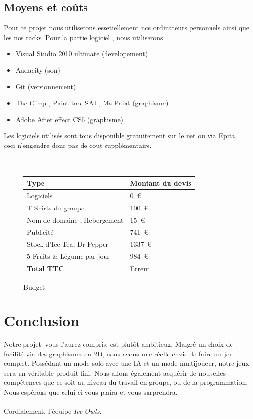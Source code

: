 \documentclass[12pt,a4paper]{article}
\begin{document}
      \subsection{Moyens et coûts}

Pour ce projet nous utiliserons essetiellement nos ordinateurs personnels ainsi que les nos racks.
Pour la partie logiciel , nous utiliserons 
\begin{itemize}
\item Visual Studio 2010 ultimate (developement)
\item Audacity  (son) 
\item Git (versionnement)
\item The Gimp , Paint tool SAI , Ms Paint (graphisme)
\item Adobe After effect CS5 (graphisme)
\end{itemize}
 
Les logiciels utilisés sont tous disponible gratuitement sur le net ou via Epita, ceci n'engendre donc pas de cout supplémentaire.
\\
\\
\\

\begin{figure}[h!]\begin{center}
\begin{tabular}{|l|l|}
\hline
Type &Montant du devis \\ \hline
Logiciels & 0~\euro{} \\ \hline
T-Shirts du groupe & 100~\euro{} \\ \hline
Nom de domaine , Hebergement & 15~\euro{} \\ \hline
Publicité & 741~\euro{} \\ \hline
Stock d'Ice Tea, Dr Pepper & 1337~\euro{} \\ \hline
5 Fruits \& Légume par jour & 984~\euro{} \\ \hline
\textbf{Total TTC} & Erreur \\ \hline


\end{tabular}
\caption{Budget}
\end{center}\end{figure}


\newpage

\section*{Conclusion}   
Notre projet, vous l'aurez compris, est plutôt ambitieux. Malgré un choix de facilité via des graphismes en 2D, nous avons une réelle envie de faire un jeu complet. Possédant un mode solo avec une IA et un mode multijoueur, notre jeux sera un véritable produit fini. Nous allons également acquérir de nouvelles compétences que ce soit au niveau du travail en groupe, ou de la programmation. Nous espérons que celui-ci vous plaira et vous surprendra.
\\
\\



 Cordialement, l'équipe \textit{Ice Owls}.
\end{document}
